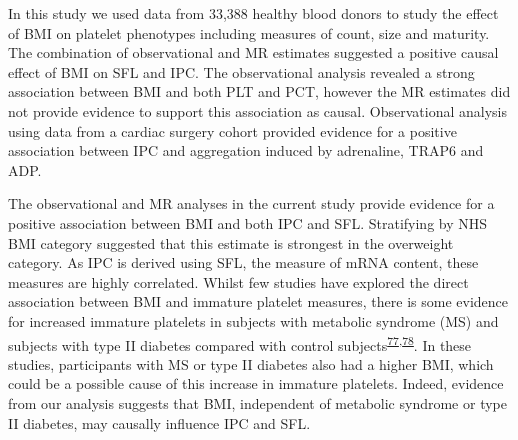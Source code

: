 \documentclass[11pt,twoside]{bristolthesis}
\begin{document}
In this study we used data from 33,388 healthy blood donors to study the effect of BMI on platelet phenotypes including measures of count, size and maturity. The combination of observational and MR estimates suggested a positive causal effect of BMI on SFL and IPC. The observational analysis revealed a strong association between BMI and both PLT and PCT, however the MR estimates did not provide evidence to support this association as causal. Observational analysis using data from a cardiac surgery cohort provided evidence for a positive association between IPC and aggregation induced by adrenaline, TRAP6 and ADP.

The observational and MR analyses in the current study provide evidence for a positive association between BMI and both IPC and SFL. Stratifying by NHS BMI category suggested that this estimate is strongest in the overweight category. As IPC is derived using SFL, the measure of mRNA content, these measures are highly correlated. Whilst few studies have explored the direct association between BMI and immature platelet measures, there is some evidence for increased immature platelets in subjects with metabolic syndrome (MS) and subjects with type II diabetes compared with control subjects\textsuperscript{\protect\hyperlink{ref-Vaduganathan2008a}{77},\protect\hyperlink{ref-Mijovic2015a}{78}}. In these studies, participants with MS or type II diabetes also had a higher BMI, which could be a possible cause of this increase in immature platelets. Indeed, evidence from our analysis suggests that BMI, independent of metabolic syndrome or type II diabetes, may causally influence IPC and SFL.
\end{document}
